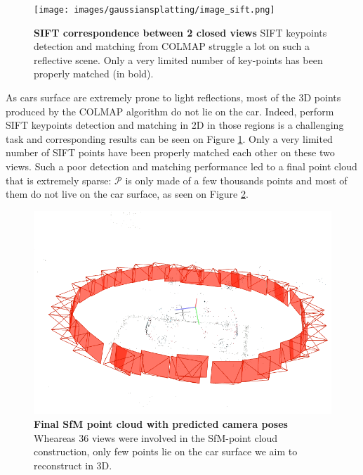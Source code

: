 \begin{figure}[htbp!]
    \center
  \texttt{[image: images/gaussiansplatting/image\_sift.png]}
  \caption{\textbf{SIFT correspondence between 2 closed views} SIFT keypoints detection and matching from COLMAP struggle a lot on such a reflective scene. Only a very limited number of key-points has been properly matched (in bold).}
  \label{fig:sift-colmap}
\end{figure}

As cars surface are extremely prone to light reflections, most of the 3D points produced by the COLMAP algorithm do not lie on the car. Indeed, perform SIFT keypoints detection and matching in 2D in those regions is a challenging task and corresponding results can be seen on Figure \ref{fig:sift-colmap}. Only a very limited number of SIFT points have been properly matched each other on these two views. Such a poor detection and matching performance led to a 
final point cloud that is extremely sparse: $\mathcal{P}$ is only made of a few thousands points and most of them do not live on the car surface, as seen on Figure \ref{fig:sfm-colmap-pc}. 

\begin{figure}[htbp!]
    \center
  \includegraphics[width=.8\linewidth]{images/gaussiansplatting/colmap_sparsePC.png}
  \caption{\textbf{Final SfM point cloud with predicted camera poses} Wheareas 36 views were involved in the \ac{SfM}-point cloud construction, only few points lie on the car surface we aim to reconstruct in 3D.}
  \label{fig:sfm-colmap-pc}
\end{figure}

